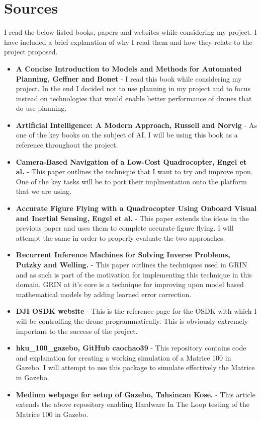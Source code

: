 \documentclass[]{../resources/final_report}
\begin{document}
\section{Sources}
I read the below listed books, papers and websites while considering my project. I have included a brief explanation of why I read them and how they relate to the project proposed.

\begin{itemize}
  \item \textbf{A Concise Introduction to Models and Methods for Automated Planning, Geffner and Bonet} \cite{Geffner:2013:CIM:2534474} -  I read this book while considering my project. In the end I decided not to use planning in my project and to focus instead on technologies that would enable better performance of drones that do use planning.
  \item \textbf{Artificial Intelligence: A Modern Approach, Russell and Norvig} \cite{Russell:2009:AIM:1671238} - As one of the key books on the subject of AI, I will be using this book as a reference throughout the project.
  \item \textbf{Camera-Based Navigation of a Low-Cost Quadrocopter, Engel et al.} \cite{Engel:Camera-basedNav}  - This paper outlines the technique that I want to try and improve upon. One of the key tasks will be to port their implmentation onto the platform that we are using.
  \item \textbf{Accurate Figure Flying with a Quadrocopter Using Onboard Visual and Inertial Sensing, Engel et al.} \cite{Engel:FigureFlying} - This paper extends the ideas in the previous paper and uses them to complete accurate figure flying. I will attempt the same in order to properly evaluate the two approaches.
  \item \textbf{Recurrent Inference Machines for Solving Inverse Problems, Putzky and Welling.} \cite{DBLP:journals/corr/PutzkyW17}  - This paper outlines the techniques used in GRIN and as such is part of the motivation for implementing this technique in this domain. GRIN at it's core is a technique for improving upon model based mathematical models by adding learned error correction.
  \item \textbf{DJI OSDK website} \cite{dji:OSDK}- This is the reference page for the OSDK with which I will be controlling the drone programmatically. This is obviously extremely important to the success of the project.
  \item \textbf{hku\_100\_gazebo, GitHub caochao39} \cite{caochao39} - This repository contains code and explanation for creating a working simulation of a Matrice 100 in Gazebo. I will attempt to use this package to simulate effectively the Matrice in Gazebo.
  \item \textbf{Medium webpage for setup of Gazebo, Tahsincan Kose.} \cite{kose_2019} - This article extends the above repository enabling Hardware In The Loop testing of the Matrice 100 in Gazebo.
\end{itemize}
\end{document}
